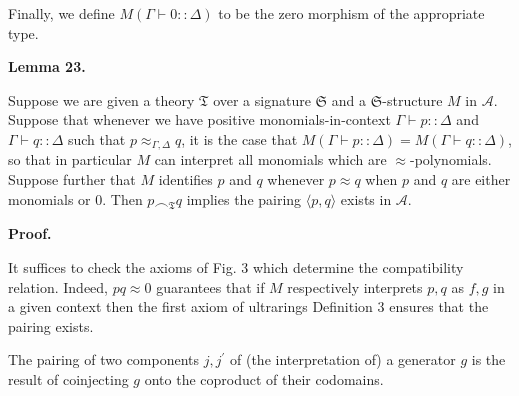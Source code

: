 \documentclass[10pt,a4paper]{amsart}
\begin{document}
 
 
Finally, we define $M\left(\Gamma\vdash 0::\Delta\right)$ to be the zero morphism of the appropriate type.\par
 
 
 
\par\medskip\noindent\textbf{Lemma 23.}\par
 
 
Suppose we are given a theory $\mathfrak{T}$ over a signature $\mathfrak{S}$ and a $\mathfrak{S}$-structure $M$ in $\mathcal{A}$. Suppose that whenever we have positive monomials-in-context $\Gamma\vdash p::\Delta$ and $\Gamma\vdash q::\Delta$ such that $p\approx_{\Gamma,\Delta}q$, it is the case that $M(\Gamma\vdash p::\Delta)=M(\Gamma\vdash q::\Delta)$, so that in particular $M$ can interpret all monomials which are $\approx$-polynomials. Suppose further that $M$ identifies $p$ and $q$ whenever $p\approx q$ when $p$ and $q$ are either monomials or $0$. Then $p\frown_{\mathfrak{T}}q$ implies the pairing $\langle p,q\rangle$ exists in $\mathcal{A}$.\par
 
 
 
 
\par\medskip\noindent\textbf{Proof.}\par
 
 
It suffices to check the axioms of Fig. 3 which determine the compatibility relation. Indeed, $pq\approx 0$ guarantees that if $M$ respectively interprets $p,q$ as $f,g$ in a given context then the first axiom of ultrarings Definition 3 ensures that the pairing exists.\par
 
 
 
The pairing of two components $j,j^{\prime}$ of (the interpretation of) a generator $g$ is the result of coinjecting $g$ onto the coproduct of their codomains.\par
 
 
\end{document}
